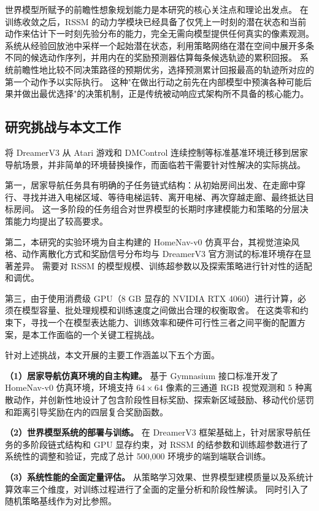 \documentclass[12pt,a4paper]{ctexart}
\begin{document}
世界模型所赋予的前瞻性想象规划能力是本研究的核心关注点和理论出发点。
在训练收敛之后，RSSM 的动力学模块已经具备了仅凭上一时刻的潜在状态和当前动作来估计下一时刻先验分布的能力，完全无需向模型提供任何真实的像素观测。
系统从经验回放池中采样一个起始潜在状态，利用策略网络在潜在空间中展开多条不同的候选动作序列，并用内在的奖励预测器估算每条候选轨迹的累积回报。
系统前瞻性地比较不同决策路径的预期优劣，选择预测累计回报最高的轨迹所对应的第一个动作予以实际执行。
这种"在做出行动之前先在内部模型中预演各种可能后果并做出最优选择"的决策机制，正是传统被动响应式架构所不具备的核心能力。

\subsection{研究挑战与本文工作}

将 DreamerV3 从 Atari 游戏和 DMControl 连续控制等标准基准环境迁移到居家导航场景，并非简单的环境替换操作，而面临若干需要针对性解决的实际挑战。

第一，居家导航任务具有明确的子任务链式结构：从初始房间出发、在走廊中穿行、寻找并进入电梯区域、等待电梯运转、离开电梯、再次穿越走廊、最终抵达目标房间。
这一多阶段的任务组合对世界模型的长期时序建模能力和策略的分层决策能力均提出了较高要求。

第二，本研究的实验环境为自主构建的 HomeNav-v0 仿真平台，其视觉渲染风格、动作离散化方式和奖励信号分布均与 DreamerV3 官方测试的标准环境存在显著差异。
需要对 RSSM 的模型规模、训练超参数以及探索策略进行针对性的适配和调优。

第三，由于使用消费级 GPU（8 GB 显存的 NVIDIA RTX 4060）进行计算，必须在模型容量、批处理规模和训练速度之间做出合理的权衡取舍。
在这类零和约束下，寻找一个在模型表达能力、训练效率和硬件可行性三者之间平衡的配置方案，是本工作面临的一个关键工程挑战。

针对上述挑战，本文开展的主要工作涵盖以下五个方面。

\textbf{（1）居家导航仿真环境的自主构建。}
基于 Gymnasium 接口标准开发了 HomeNav-v0 仿真环境，环境支持 $64\times64$ 像素的三通道 RGB 视觉观测和 5 种离散动作，并创新性地设计了包含阶段性目标奖励、探索新区域鼓励、移动代价惩罚和距离引导奖励在内的四层复合奖励函数。

\textbf{（2）世界模型系统的部署与训练。}
在 DreamerV3 框架基础上，针对居家导航任务的多阶段链式结构和 GPU 显存约束，对 RSSM 的结参数和训练超参数进行了系统性的调整和验证，完成了总计 500,000 环境步的端到端联合训练。

\textbf{（3）系统性能的全面定量评估。}
从策略学习效果、世界模型建模质量以及系统计算效率三个维度，对训练过程进行了全面的定量分析和阶段性解读。
同时引入了随机策略基线作为对比参照。
\end{document}
